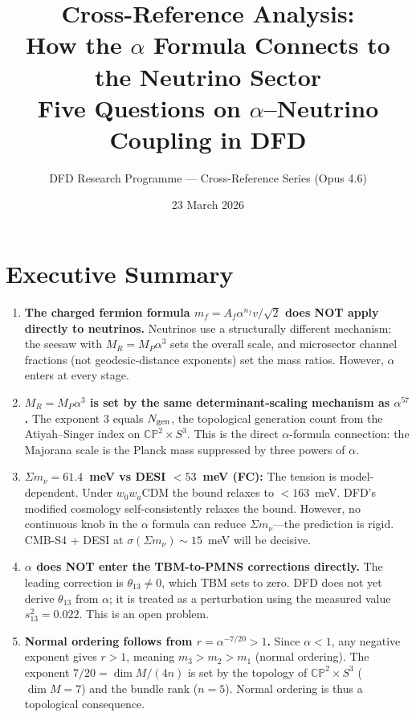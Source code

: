 \documentclass[11pt,a4paper]{article}
\title{\textbf{Cross-Reference Analysis:\\
How the $\alpha$ Formula Connects to the Neutrino Sector}\\[0.5em]
\large Five Questions on $\alpha$--Neutrino Coupling in DFD}
\author{DFD Research Programme --- Cross-Reference Series (Opus 4.6)}
\date{23 March 2026}
\begin{document}
\maketitle

\section*{Executive Summary}

\begin{tcolorbox}[colback=yellow!5!white, colframe=red!70!black,
  title=\textbf{KEY FINDINGS}]

\begin{enumerate}
\item \textbf{The charged fermion formula $m_f = A_f \alpha^{n_f} v/\sqrt{2}$
  does NOT apply directly to neutrinos.} Neutrinos use a structurally
  different mechanism: the seesaw with $M_R = M_P \alpha^3$ sets the
  overall scale, and microsector channel fractions (not geodesic-distance
  exponents) set the mass ratios. However, $\alpha$ enters at every stage.

\item \textbf{$M_R = M_P \alpha^3$ is set by the same determinant-scaling
  mechanism as $\alpha^{57}$.} The exponent 3 equals $N_{\rm gen}$, the
  topological generation count from the Atiyah--Singer index on
  $\mathbb{CP}^2 \times S^3$. This is the direct $\alpha$-formula
  connection: the Majorana scale is the Planck mass suppressed by three
  powers of $\alpha$.

\item \textbf{$\Sigma m_\nu = 61.4$~meV vs DESI $< 53$~meV (FC):} The
  tension is model-dependent. Under $w_0 w_a$CDM the bound relaxes to
  $< 163$~meV. DFD's modified cosmology self-consistently relaxes the
  bound. However, no continuous knob in the $\alpha$ formula can reduce
  $\Sigma m_\nu$---the prediction is rigid. CMB-S4 + DESI at
  $\sigma(\Sigma m_\nu) \sim 15$~meV will be decisive.

\item \textbf{$\alpha$ does NOT enter the TBM-to-PMNS corrections
  directly.} The leading correction is $\theta_{13} \neq 0$, which TBM
  sets to zero. DFD does not yet derive $\theta_{13}$ from $\alpha$; it is
  treated as a perturbation using the measured value $s_{13}^2 = 0.022$.
  This is an open problem.

\item \textbf{Normal ordering follows from $r = \alpha^{-7/20} > 1$.}
  Since $\alpha < 1$, any negative exponent gives $r > 1$, meaning
  $m_3 > m_2 > m_1$ (normal ordering). The exponent $7/20 = \dim M / (4n)$
  is set by the topology of $\mathbb{CP}^2 \times S^3$ ($\dim M = 7$) and
  the bundle rank ($n = 5$). Normal ordering is thus a topological
  consequence.
\end{enumerate}
\end{tcolorbox}
\end{document}
